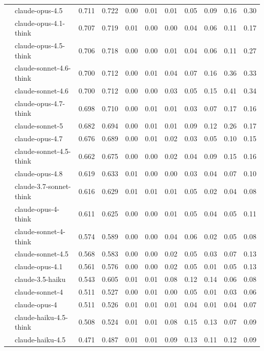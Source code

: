 \begin{longtable}{@{}ll rr rrrrrrr@{}}
 & claude-opus-4.5 & 0.711 & 0.722 & 0.00 & 0.01 & 0.01 & 0.05 & 0.09 & 0.16 & 0.30 \\
 & claude-opus-4.1-think & 0.707 & 0.719 & 0.01 & 0.00 & 0.00 & 0.04 & 0.06 & 0.11 & 0.17 \\
 & claude-opus-4.5-think & 0.706 & 0.718 & 0.00 & 0.00 & 0.01 & 0.04 & 0.06 & 0.11 & 0.27 \\
 & claude-sonnet-4.6-think & 0.700 & 0.712 & 0.00 & 0.01 & 0.04 & 0.07 & 0.16 & 0.36 & 0.33 \\
 & claude-sonnet-4.6 & 0.700 & 0.712 & 0.00 & 0.00 & 0.03 & 0.05 & 0.15 & 0.41 & 0.34 \\
 & claude-opus-4.7-think & 0.698 & 0.710 & 0.00 & 0.01 & 0.01 & 0.03 & 0.07 & 0.17 & 0.16 \\
 & claude-sonnet-5 & 0.682 & 0.694 & 0.00 & 0.01 & 0.01 & 0.09 & 0.12 & 0.26 & 0.17 \\
 & claude-opus-4.7 & 0.676 & 0.689 & 0.00 & 0.01 & 0.02 & 0.03 & 0.05 & 0.10 & 0.15 \\
 & claude-sonnet-4.5-think & 0.662 & 0.675 & 0.00 & 0.00 & 0.02 & 0.04 & 0.09 & 0.15 & 0.16 \\
 & claude-opus-4.8 & 0.619 & 0.633 & 0.01 & 0.00 & 0.00 & 0.03 & 0.04 & 0.07 & 0.10 \\
 & claude-3.7-sonnet-think & 0.616 & 0.629 & 0.01 & 0.01 & 0.01 & 0.05 & 0.02 & 0.04 & 0.08 \\
 & claude-opus-4-think & 0.611 & 0.625 & 0.00 & 0.00 & 0.01 & 0.05 & 0.04 & 0.05 & 0.11 \\
 & claude-sonnet-4-think & 0.574 & 0.589 & 0.00 & 0.00 & 0.04 & 0.06 & 0.02 & 0.05 & 0.08 \\
 & claude-sonnet-4.5 & 0.568 & 0.583 & 0.00 & 0.00 & 0.02 & 0.05 & 0.03 & 0.07 & 0.13 \\
 & claude-opus-4.1 & 0.561 & 0.576 & 0.00 & 0.00 & 0.02 & 0.05 & 0.01 & 0.05 & 0.13 \\
 & claude-3.5-haiku & 0.543 & 0.605 & 0.01 & 0.01 & 0.08 & 0.12 & 0.14 & 0.06 & 0.08 \\
 & claude-sonnet-4 & 0.511 & 0.527 & 0.00 & 0.01 & 0.00 & 0.05 & 0.01 & 0.03 & 0.06 \\
 & claude-opus-4 & 0.511 & 0.526 & 0.01 & 0.01 & 0.01 & 0.04 & 0.01 & 0.04 & 0.07 \\
 & claude-haiku-4.5-think & 0.508 & 0.524 & 0.01 & 0.01 & 0.08 & 0.15 & 0.13 & 0.07 & 0.09 \\
 & claude-haiku-4.5 & 0.471 & 0.487 & 0.01 & 0.01 & 0.09 & 0.13 & 0.11 & 0.12 & 0.09 \\

\end{longtable}
